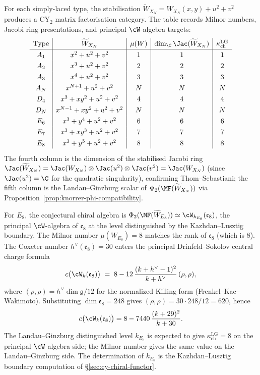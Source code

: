 \begin{remark}
\label{rem:stabilised-ade-table}
For each simply-laced type, the stabilisation $\widetilde{W}_{X_N} = W_{X_N}(x, y) + u^2 + v^2$ produces a CY$_2$ matrix factorisation category. The table records Milnor numbers, Jacobi ring presentations, and principal $\cW$-algebra targets:
\[
 \renewcommand{\arraystretch}{1.3}
 \begin{array}{c|c|c|c|c}
 \text{Type} & \widetilde{W}_{X_N} & \mu(W) & \dim_\C \Jac(\widetilde{W}_{X_N}) & \kappa_{\mathrm{ch}}^{\mathrm{LG}} \\
 \hline
 A_1 & x^2 + u^2 + v^2 & 1 & 1 & 1 \\
 A_2 & x^3 + u^2 + v^2 & 2 & 2 & 2 \\
 A_3 & x^4 + u^2 + v^2 & 3 & 3 & 3 \\
 A_N & x^{N+1} + u^2 + v^2 & N & N & N \\
 D_4 & x^3 + xy^2 + u^2 + v^2 & 4 & 4 & 4 \\
 D_N & x^{N-1} + xy^2 + u^2 + v^2 & N & N & N \\
 E_6 & x^3 + y^4 + u^2 + v^2 & 6 & 6 & 6 \\
 E_7 & x^3 + xy^3 + u^2 + v^2 & 7 & 7 & 7 \\
 E_8 & x^3 + y^5 + u^2 + v^2 & 8 & 8 & 8
 \end{array}
\]
The fourth column is the dimension of the stabilised Jacobi ring $\Jac(\widetilde{W}_{X_N}) = \Jac(W_{X_N}) \otimes \Jac(u^2) \otimes \Jac(v^2) = \Jac(W_{X_N})$ (since $\Jac(u^2) = \C$ for the quadratic singularity), confirming Thom--Sebastiani; the fifth column is the Landau--Ginzburg scalar of $\Phi_2(\MF(\widetilde{W}_{X_N}))$ via Proposition~\ref{prop:knorrer-phi-compatibility}.
\end{remark}

\begin{remark}
\label{rem:e8-cross-check}
For $E_8$, the conjectural chiral algebra is $\Phi_2(\MF(\widetilde{W}_{E_8})) \simeq \cW_{k_{E_8}}(\mathfrak{e}_8)$, the principal $\cW$-algebra of $\mathfrak{e}_8$ at the level distinguished by the Kazhdan--Lusztig boundary. The Milnor number $\mu(W_{E_8}) = 8$ matches the rank of $\mathfrak{e}_8$ (which is $8$). The Coxeter number $h^\vee(\mathfrak{e}_8) = 30$ enters the principal Drinfeld--Sokolov central charge formula
\[
 c\bigl(\cW_k(\mathfrak{e}_8)\bigr) \;=\; 8 -
 12\,\frac{(k+h^\vee-1)^2}{k+h^\vee}\,(\rho,\rho),
\]
where $(\rho,\rho)=h^\vee\dim\mathfrak g/12$ for the normalized Killing form (Frenkel--Kac--Wakimoto). Substituting $\dim \mathfrak{e}_8 = 248$ gives $(\rho,\rho)=30\cdot 248/12=620$, hence
\[
 c\bigl(\cW_k(\mathfrak e_8)\bigr)=
 8-7440\,\frac{(k+29)^2}{k+30}.
\]
The Landau--Ginzburg distinguished level $k_{E_8}$ is expected to give $\kappa_{\mathrm{ch}}^{\mathrm{LG}} = 8$ on the principal $\cW$-algebra side; the Milnor number gives the same value on the Landau--Ginzburg side. The determination of \(k_{E_8}\) is the Kazhdan--Lusztig boundary computation of \S\ref{sec:cy-chiral-functor}.
\end{remark}

